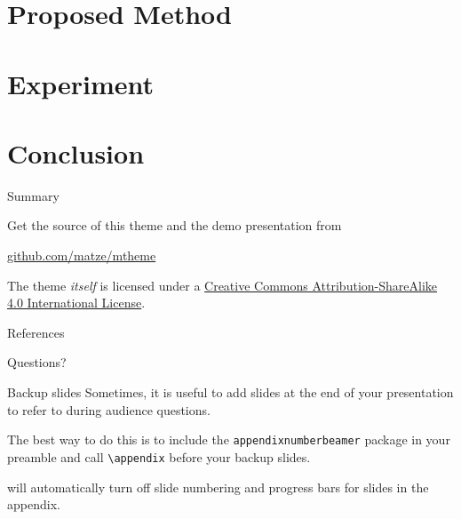 \documentclass[15pt,aspectratio=169]{beamer}
\begin{document}
\section{Proposed Method}

\section{Experiment}

\section{Conclusion}

\begin{frame}{Summary}

  Get the source of this theme and the demo presentation from

  \begin{center}\url{github.com/matze/mtheme}\end{center}

  The theme \emph{itself} is licensed under a
  \href{http://creativecommons.org/licenses/by-sa/4.0/}{Creative Commons
  Attribution-ShareAlike 4.0 International License}.

  \begin{center}\ccbysa\end{center}

\end{frame}

\begin{frame}[allowframebreaks]{References}
\printbibliography[heading=none]
\end{frame}

\begin{frame}[standout]
  Questions?
\end{frame}

\appendix

\begin{frame}[fragile]{Backup slides}
  Sometimes, it is useful to add slides at the end of your presentation to
  refer to during audience questions.

  The best way to do this is to include the \verb|appendixnumberbeamer|
  package in your preamble and call \verb|\appendix| before your backup slides.

  \themename will automatically turn off slide numbering and progress bars for
  slides in the appendix.
\end{frame}
\end{document}
